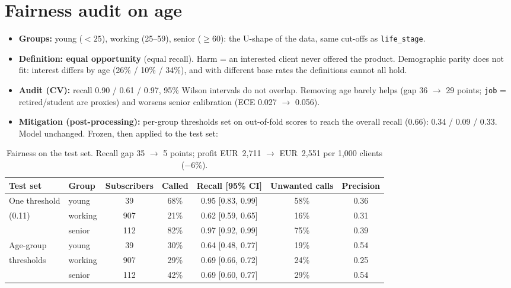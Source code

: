 \documentclass[11pt,a4paper]{article}
\newcommand{\eur}[1]{EUR~#1}
\begin{document}
\section{Fairness audit on age}\label{sec:fairness}

\begin{itemize}
  \item \textbf{Groups:} young ($<25$), working (25--59), senior ($\geq 60$): the U-shape of the data,
  same cut-offs as \texttt{life\_stage}.
  \item \textbf{Definition: equal opportunity} (equal recall). Harm = an interested client never
  offered the product. Demographic parity does not fit: interest differs by age (26\% / 10\% / 34\%),
  and with different base rates the definitions cannot all hold.
  \item \textbf{Audit (CV):} recall 0.90 / 0.61 / 0.97, 95\% Wilson intervals do not overlap. Removing
  age barely helps (gap 36 $\rightarrow$ 29 points; \texttt{job} = retired/student are proxies) and
  worsens senior calibration (ECE 0.027 $\rightarrow$ 0.056).
  \item \textbf{Mitigation (post-processing):} per-group thresholds set on out-of-fold scores to reach
  the overall recall (0.66): 0.34 / 0.09 / 0.33. Model unchanged. Frozen, then applied to the test set:
\end{itemize}

\begin{table}[H]
\centering\small
\begin{tabular}{llccccc}
\toprule
Test set & Group & Subscribers & Called & Recall [95\% CI] & Unwanted calls & Precision \\
\midrule
One threshold & young & 39 & 68\% & 0.95 [0.83, 0.99] & 58\% & 0.36 \\
(0.11) & working & 907 & 21\% & 0.62 [0.59, 0.65] & 16\% & 0.31 \\
 & senior & 112 & 82\% & 0.97 [0.92, 0.99] & 75\% & 0.39 \\
\midrule
Age-group & young & 39 & 30\% & 0.64 [0.48, 0.77] & 19\% & 0.54 \\
thresholds & working & 907 & 29\% & 0.69 [0.66, 0.72] & 24\% & 0.25 \\
 & senior & 112 & 42\% & 0.69 [0.60, 0.77] & 29\% & 0.54 \\
\bottomrule
\end{tabular}
\caption{Fairness on the test set. Recall gap 35 $\rightarrow$ 5 points; profit \eur{2,711}
$\rightarrow$ \eur{2,551} per 1,000 clients ($-6\%$).}
\label{tab:fairness}
\end{table}
\end{document}
